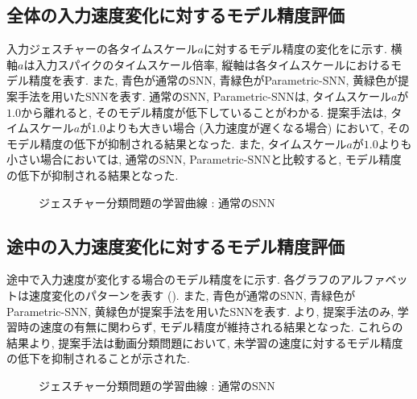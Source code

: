 \subsection{全体の入力速度変化に対するモデル精度評価}
入力ジェスチャーの各タイムスケール$a$に対するモデル精度の変化をに示す.
横軸$a$は入力スパイクのタイムスケール倍率, 縦軸は各タイムスケールにおけるモデル精度を表す.
また, 青色が通常のSNN, 青緑色がParametric-SNN, 黄緑色が提案手法を用いたSNNを表す.
通常のSNN, Parametric-SNNは, タイムスケール$a$が$1.0$から離れると, そのモデル精度が低下していることがわかる.
提案手法は, タイムスケール$a$が$1.0$よりも大きい場合 (入力速度が遅くなる場合) において, そのモデル精度の低下が抑制される結果となった.
また, タイムスケール$a$が$1.0$よりも小さい場合においては, 通常のSNN, Parametric-SNNと比較すると, モデル精度の低下が抑制される結果となった.
\begin{figure}[htb]
    \centering
    
    \caption{ジェスチャー分類問題の学習曲線 : 通常のSNN}
    \label{fig:result2:2}
\end{figure}


\subsection{途中の入力速度変化に対するモデル精度評価}
途中で入力速度が変化する場合のモデル精度をに示す.
各グラフのアルファベットは速度変化のパターンを表す ().
また, 青色が通常のSNN, 青緑色がParametric-SNN, 黄緑色が提案手法を用いたSNNを表す.
より, 提案手法のみ, 学習時の速度の有無に関わらず, モデル精度が維持される結果となった.
これらの結果より, 提案手法は動画分類問題において, 未学習の速度に対するモデル精度の低下を抑制されることが示された.
\begin{figure}[htb]
    \centering
    
    \caption{ジェスチャー分類問題の学習曲線 : 通常のSNN}
    \label{fig:result2:2}
\end{figure}
